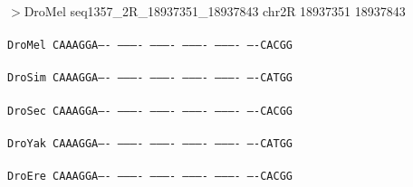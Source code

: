 \documentclass[11pt,twoside,reqno,a4paper]{article}
\begin{document}
\noindent
\newlength{\charwidth}$>$DroMel	seq1357\_2R\_18937351\_18937843	chr2R	18937351	18937843 \\
 \\
\texttt{DroMel	CAAAGGA----	----------	----------	----------	----------	----CACGG\\
\hspace*{7\charwidth}\hspace*{1\charwidth}\hspace*{1\charwidth}\hspace*{1\charwidth}\hspace*{1\charwidth}\hspace*{1\charwidth}\\
DroSim	CAAAGGA----	----------	----------	----------	----------	----CATGG\\
\hspace*{7\charwidth}\hspace*{1\charwidth}\hspace*{1\charwidth}\hspace*{1\charwidth}\hspace*{1\charwidth}\hspace*{1\charwidth}\\
DroSec	CAAAGGA----	----------	----------	----------	----------	----CACGG\\
\hspace*{7\charwidth}\hspace*{1\charwidth}\hspace*{1\charwidth}\hspace*{1\charwidth}\hspace*{1\charwidth}\hspace*{1\charwidth}\\
DroYak	CAAAGGA----	----------	----------	----------	----------	----CATGG\\
\hspace*{7\charwidth}\hspace*{1\charwidth}\hspace*{1\charwidth}\hspace*{1\charwidth}\hspace*{1\charwidth}\hspace*{1\charwidth}\\
DroEre	CAAAGGA----	----------	----------	----------	----------	----CACGG\\
\hspace*{7\charwidth}\hspace*{1\charwidth}\hspace*{1\charwidth}\hspace*{1\charwidth}\hspace*{1\charwidth}\hspace*{1\charwidth}\\
}
\end{document}

